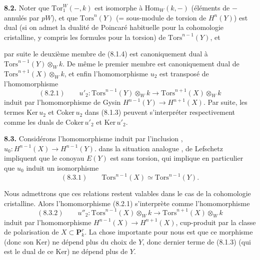 \documentclass[11pt,a4paper]{article}
\begin{document}
\textbf{8.2.} Noter que $\mathrm{Tor}^{W}_{1}(-, k)$ est isomorphe à
$\mathrm{Hom}_{W}(k, -)$ (éléments de $-$ annulés par $pW$), et que
$\mathrm{Tors}^{n}(Y)$ (= sous-module de torsion de $H^{n}(Y)$) est dual (si on
admet la dualité de Poincaré habituelle pour la cohomologie cristalline, y
compris les formules pour la torsion) de $\mathrm{Tors}^{n-1}(Y)$, et



par suite le deuxième membre de (8.1.4) est canoniquement dual à
$\mathrm{Tors}^{n-1}(Y) \otimes_{W} k$. De même le premier membre est
canoniquement dual de $\mathrm{Tors}^{n+1}(X) \otimes_{W} k$, et enfin
l'homomorphisme $u_{2}$ est transposé de l'homomorphisme
\[
(8.2.1) \qquad u'_{2} : \mathrm{Tors}^{n-1}(Y) \otimes_{W} k \to
\mathrm{Tors}^{n+1}(X) \otimes_{W} k
\]
induit par l'homomorphisme de Gysin $H^{n-1}(Y) \to H^{n+1}(X)$. Par suite,
les termes $\mathrm{Ker}\, u_{2}$ et $\mathrm{Coker}\, u_{2}$ dans (8.1.3)
peuvent s'interpréter respectivement comme les duals de $\mathrm{Coker}\,
u'_{2}$ et $\mathrm{Ker}\, u'_{2}$.

\textbf{8.3.} Considérons l'homomorphisme induit par l'inclusion ,\quad $u_{0} : H^{n-1}(X) \to H^{n-1}(Y)$.  dans la
situation analogue  ,   de
Lefschetz   impliquent que le conoyau
$E(Y)$ est sans torsion,  qui implique en particulier que $u_{0}$
induit un isomorphisme
\[
(8.3.1) \qquad \mathrm{Tors}^{n-1}(X) \simeq \mathrm{Tors}^{n-1}(Y).
\]

Nous admettrons que ces relations restent valables dans le cas de la
cohomologie cristalline. Alors l'homomorphisme (8.2.1) s'interprète comme
l'homomorphisme
\[
(8.3.2) \qquad u''_{2} : \mathrm{Tors}^{n-1}(X) \otimes_{W} k \to
\mathrm{Tors}^{n+1}(X) \otimes_{W} k
\]
induit par l'homomorphisme $H^{n-1}(X) \to H^{n+1}(X)$, cup-produit par la
classe de polarisation de $X \subset \mathbf{P}^{r}_{k}$. La chose importante
pour nous est que ce morphisme (donc son Ker) ne dépend plus du choix de $Y$,
donc  \add{\ill{}}  dernier terme de (8.1.3) (qui est le
dual de ce Ker) ne dépend plus de $Y$.
\end{document}
